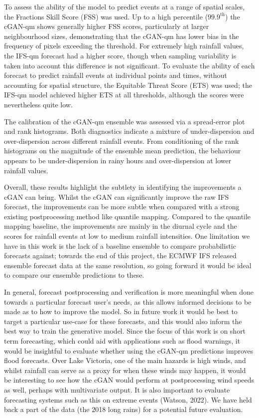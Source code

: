 \documentclass{article}
\begin{document}
To assess the ability of the model to predict events at a range of spatial scales, the Fractions Skill Score (FSS) was used. Up to a high percentile ($99.9^{\text{th}}$) the cGAN-qm shows generally higher FSS scores, particularly at larger neighbourhood sizes, demonstrating that the cGAN-qm has lower bias in the frequency of pixels exceeding the threshold. For extremely high rainfall values, the IFS-qm forecast had a higher score, though when sampling variability is taken into account this difference is not significant. To evaluate the ability of each forecast to predict rainfall events at individual points and times, without accounting for spatial structure, the Equitable Threat Score (ETS) was used; the IFS-qm model achieved higher ETS at all thresholds, although the scores were nevertheless quite low.



The calibration of the cGAN-qm ensemble was assessed via a spread-error plot and rank histograms. Both diagnostics indicate a mixture of under-dispersion and over-dispersion across different rainfall events. From conditioning of the rank histograms on the magnitude of the ensemble mean prediction, the behaviour appears to be under-dispersion in rainy hours and over-dispersion at lower rainfall values.

Overall, these results highlight the subtlety in identifying the improvements a cGAN can bring. Whilst the cGAN can significantly improve the raw IFS forecast, the improvements can be more subtle when compared with a strong existing postprocessing method like quantile mapping. Compared to the quantile mapping baseline, the improvements are mainly in the diurnal cycle and the scores for rainfall events at low to medium rainfall intensities. One limitation we have in this work is the lack of a baseline ensemble to compare probabilistic forecasts against; towards the end of this project, the ECMWF IFS released ensemble forecast data at the same resolution, so going forward it would be ideal to compare our ensemble predictions to these. 
 
In general, forecast postprocessing and verification is more meaningful when done towards a particular forecast user's needs, as this allows informed decisions to be made as to how to improve the model. So in future work it would be best to target a particular use-case for these forecasts, and this would also inform the best way to train the generative model. Since the focus of this work is on short term forecasting, which could aid with applications such as flood warnings, it would be insightful to evaluate whether using the cGAN-qm predictions improves flood forecasts. Over Lake Victoria, one of the main hazards is high winds, and whilst rainfall can serve as a proxy for when these winds may happen, it would be interesting to see how the cGAN would perform at postprocessing wind speeds as well, perhaps with multivariate output. It is also important to evaluate forecasting systems such as this on extreme events (Watson, 2022). We have held back a part of the data (the 2018 long rains) for a potential future evaluation.
\end{document}
